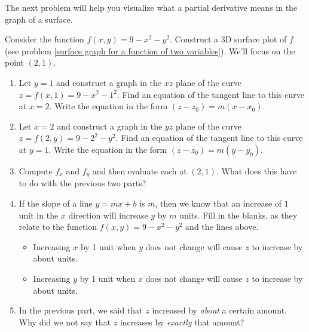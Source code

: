 The next problem will help you visualize what a partial derivative means in the graph of a surface.
\begin{problem} \label{cake introduction}%
%
 Consider the function $f(x,y)=9-x^2-y^2$.  Construct a 3D surface plot of $f$ (see problem \ref{surface graph for a function of two variables}). We'll focus on the point $(2,1)$.
\begin{enumerate}
 \item Let $y=1$ and construct a graph in the $xz$ plane of the curve $z=f(x,1)=9-x^2-1^2$. Find an equation of the tangent line to this curve at $x=2$. Write the equation in the form $(z-z_0)=m(x-x_0)$.
 \item Let $x=2$ and construct a graph in the $yz$ plane of the curve $z=f(2,y)=9-2^2-y^2$. Find an equation of the tangent line to this curve at $y=1$. Write the equation in the form $(z-z_0)=m(y-y_0)$.
 \item Compute $f_x$ and $f_y$ and then evaluate each at $(2,1)$.  What does this have to do with the previous two parts?
 \item If the slope of a line $y=mx+b$ is $m$, then we know that an increase of $1$ unit in the $x$ direction will increase $y$ by $m$ units. Fill in the blanks, as they relate to the function $f(x,y)=9-x^2-y^2$ and the lines above.
\begin{itemize}
 \item Increasing $x$ by 1 unit when $y$ does not change will cause $z$ to increase by about \blank{1cm} units.
 \item Increasing $y$ by 1 unit when $x$ does not change will cause $z$ to increase by about \blank{1cm} units.
\end{itemize}
\item In the previous part, we said that $z$ increased by \emph{about} a certain amount.  Why did we not say that $z$ increases by \emph{exactly} that amount?
\end{enumerate}
\end{problem}

